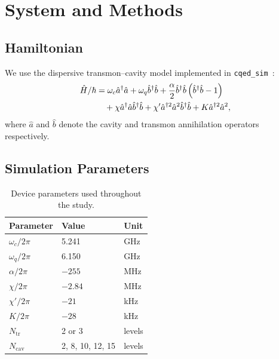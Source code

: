 \documentclass[aps,pra,twocolumn,reprint,amsmath,amssymb]{revtex4-2}
\begin{document}
\section{System and Methods}
\subsection{Hamiltonian}
We use the dispersive transmon--cavity model implemented in
\texttt{cqed\_sim}~\cite{cqed_sim,blais2021circuit}:
\begin{align}
\hat{H}/\hbar &= \omega_c \hat{a}^{\dagger}\hat{a}
+ \omega_q \hat{b}^{\dagger}\hat{b}
+ \frac{\alpha}{2}\hat{b}^{\dagger}\hat{b}\left(\hat{b}^{\dagger}\hat{b}-1\right)
\notag\\
&\quad + \chi \hat{a}^{\dagger}\hat{a}\hat{b}^{\dagger}\hat{b}
+ \chi' \hat{a}^{\dagger 2}\hat{a}^{2}\hat{b}^{\dagger}\hat{b}
+ K \hat{a}^{\dagger 2}\hat{a}^{2},
\end{align}
where $\hat{a}$ and $\hat{b}$ denote the cavity and transmon annihilation
operators respectively.

\subsection{Simulation Parameters}
\begin{table}[t]
\centering
\caption{Device parameters used throughout the study.}
\begin{tabular}{@{}lll@{}}
\toprule
Parameter & Value & Unit \\
\midrule
$\omega_c/2\pi$ & 5.241 & GHz \\
$\omega_q/2\pi$ & 6.150 & GHz \\
$\alpha/2\pi$ & $-255$ & MHz \\
$\chi/2\pi$ & $-2.84$ & MHz \\
$\chi'/2\pi$ & $-21$ & kHz \\
$K/2\pi$ & $-28$ & kHz \\
$N_{\mathrm{tr}}$ & 2 or 3 & levels \\
$N_{\mathrm{cav}}$ & 2, 8, 10, 12, 15 & levels \\
\bottomrule
\end{tabular}
\end{table}
\end{document}
